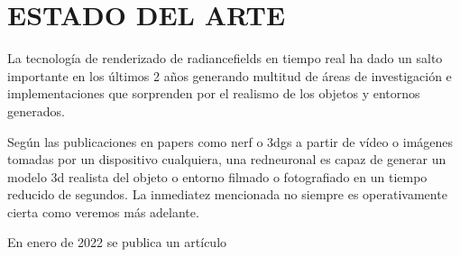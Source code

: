 \documentclass[a4paper, 12pt, spanish, twoside]{article}
\begin{document}
\clearpage





\newpage
\section{ESTADO DEL ARTE} \label{sec:estado_del_arte}

La tecnología de \gls{renderizado} de \glspl{radiancefield} en tiempo real ha dado un salto importante en los últimos 2 años generando multitud de áreas de investigación e implementaciones que sorprenden por el realismo de los objetos y entornos generados.

Según las publicaciones en papers como \acrfull{nerf} o \acrfull{3dgs} a partir de vídeo o imágenes tomadas por un dispositivo cualquiera, una \gls{redneuronal} es capaz de generar un modelo \acrshort{3d} realista del objeto o entorno filmado o fotografiado en un tiempo reducido de segundos. La inmediatez mencionada no siempre es operativamente cierta como veremos más adelante.



En enero de 2022 se publica un artículo







\clearpage




\end{document}
